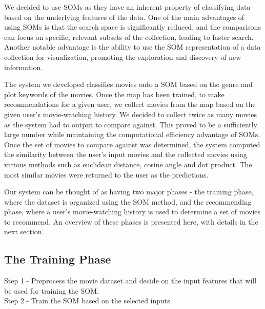 \documentclass[conference]{IEEEtran}
\begin{document}
We decided to use SOMs as they have an inherent property of classifying data based on the underlying features of the data. One of the main advantages of using SOMs is that the search space is significantly reduced, and the comparisons can focus on specific, relevant subsets of the collection, leading to faster search. Another notable advantage is the ability to use the SOM representation of a data collection for visualization, promoting the exploration and discovery of new information.

The system we developed classifies movies onto a SOM based on the genre and plot keywords of the movies. Once the map has been trained, to make recommendations for a given user, we collect movies from the map based on the given user’s movie-watching history. We decided to collect twice as many movies as the system had to output to compare against. This proved to be a sufficiently large number while maintaining the computational efficiency advantage of SOMs. Once the set of movies to compare against was determined, the system computed the similarity between the user’s input movies and the collected movies using various methods such as euclidean distance, cosine angle and dot product. The most similar movies were returned to the user as the predictions.

Our system can be thought of as having two major phases - the training phase, where the dataset is organized using the SOM method, and the recommending phase, where a user’s movie-watching history is used to determine a set of movies to recommend. An overview of these phases is presented here, with details in the next section.

\subsection{The Training Phase}
Step 1 - Preprocess the movie dataset and decide on the input features that will be used for training the SOM. 
\vspace{2mm}
\\\indent Step 2 - Train the SOM based on the selected inputs
\end{document}
